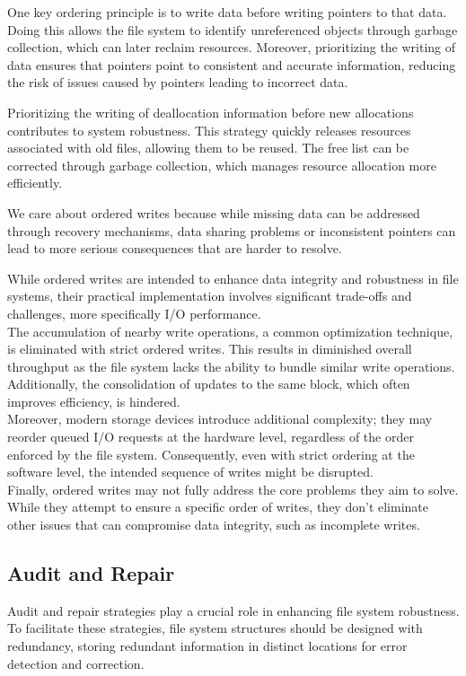 \documentclass{report}
\newcommand{\corollaryBegin}[1]{\begin{tcolorbox}[colback=teal!5!white,colframe=black!75!teal,title={Corollary:
      #1}]}
\newcommand{\corollaryEnd}{\end{tcolorbox}}
\begin{document}
One key ordering principle is to write data before writing pointers to that data. Doing this
allows the file system to identify unreferenced objects through garbage collection, which can later
reclaim resources. Moreover, prioritizing the writing of data ensures that pointers point to
consistent and accurate information, reducing the risk of issues caused by pointers leading to
incorrect data. 

Prioritizing the writing of deallocation information before new allocations contributes to system
robustness. This strategy quickly releases resources associated with old files, allowing them to be
reused. The free list can be corrected through garbage collection, which manages resource allocation
more efficiently.

We care about ordered writes because while missing data can be addressed through recovery
mechanisms, data sharing problems or inconsistent pointers can lead to more serious consequences
that are harder to resolve.

\corollaryBegin{Practicality}
While ordered writes are intended to enhance data integrity and robustness in file systems, their
practical implementation involves significant trade-offs and challenges, more specifically I/O
performance. \\

The accumulation of nearby write operations, a common optimization technique, is eliminated with
strict ordered writes. This results in diminished overall throughput as the file system lacks the
ability to bundle similar write operations. Additionally, the consolidation of updates to the same
block, which often improves efficiency, is hindered. \\

Moreover, modern storage devices introduce additional complexity; they may reorder queued I/O
requests at the hardware level, regardless of the order enforced by the file system. Consequently,
even with strict ordering at the software level, the intended sequence of writes might be
disrupted. \\

Finally, ordered writes may not fully address the core problems they aim to solve. While they
attempt to ensure a specific order of writes, they don't eliminate other issues that can compromise
data integrity, such as incomplete writes. 
\corollaryEnd


\subsection{Audit and Repair}
Audit and repair strategies play a crucial role in enhancing file system robustness. To facilitate
these strategies, file system structures should be designed with redundancy, storing redundant
information in distinct locations for error detection and correction.
\end{document}
